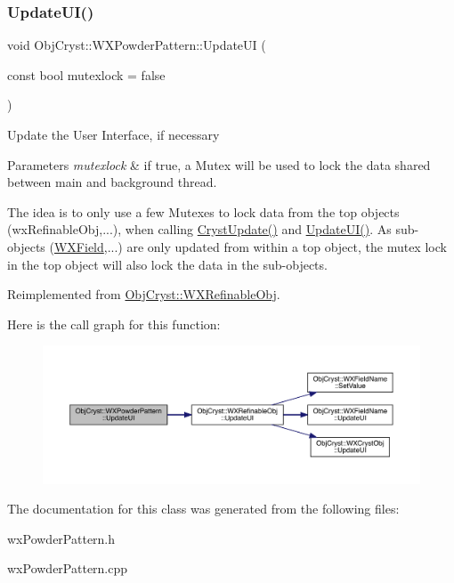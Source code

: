 \subsubsection{\texorpdfstring{UpdateUI()}{UpdateUI()}}
{\footnotesize\ttfamily void Obj\+Cryst\+::\+W\+X\+Powder\+Pattern\+::\+Update\+UI (\begin{DoxyParamCaption}\item[{const bool}]{mutexlock = {\ttfamily false} }\end{DoxyParamCaption})\hspace{0.3cm}{\ttfamily [virtual]}}

Update the User Interface, if necessary


\begin{DoxyParams}{Parameters}
{\em mutexlock} & if true, a Mutex will be used to lock the data shared between main and background thread.\\
\hline
\end{DoxyParams}
The idea is to only use a few Mutexes to lock data from the top objects (wx\+Refinable\+Obj,...), when calling \mbox{\hyperlink{class_obj_cryst_1_1_w_x_powder_pattern_a8bdd59548c11c11a53197c0679c258a8}{Cryst\+Update()}} and \mbox{\hyperlink{class_obj_cryst_1_1_w_x_powder_pattern_aaeace05033eaea9499398825fc8244da}{Update\+U\+I()}}. As sub-\/objects (\mbox{\hyperlink{class_obj_cryst_1_1_w_x_field}{W\+X\+Field}},...) are only updated from within a top object, the mutex lock in the top object will also lock the data in the sub-\/objects. 

Reimplemented from \mbox{\hyperlink{class_obj_cryst_1_1_w_x_refinable_obj_acbf70975a79661a73a1ae3c39c9c3045}{Obj\+Cryst\+::\+W\+X\+Refinable\+Obj}}.

Here is the call graph for this function\+:
\nopagebreak
\begin{figure}[H]
\begin{center}
\leavevmode
\includegraphics[width=350pt]{class_obj_cryst_1_1_w_x_powder_pattern_aaeace05033eaea9499398825fc8244da_cgraph}
\end{center}
\end{figure}


The documentation for this class was generated from the following files\+:\begin{DoxyCompactItemize}
\item 
wx\+Powder\+Pattern.\+h\item 
wx\+Powder\+Pattern.\+cpp\end{DoxyCompactItemize}
